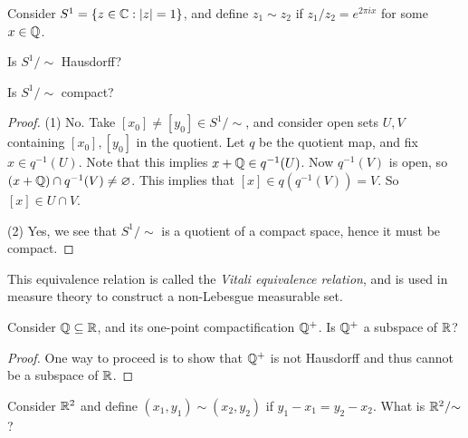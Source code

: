 \begin{exercise}
  Consider $S^1 = \{z \in \mathbb{C} : |z| = 1\}$, and
  define $z_1 \sim z_2$ if
  $z_1 / z_2 = e^{2\pi i x}$ for some
  $x \in \mathbb{Q}$.
  \begin{enumerate*}[(1)]
    \item Is $S^1 / {\sim}$ Hausdorff?
    \item Is $S^1 / {\sim}$ compact?
  \end{enumerate*}
\end{exercise}

\begin{proof}
  (1) No. Take $[x_0] \ne [y_0] \in S^1 / {\sim}$,
  and consider open sets $U, V$ containing
  $[x_0], [y_0]$ in the quotient.
  Let $q$ be the
  quotient map, and fix $x \in q^{-1}(U)$.
  Note that this implies $x + \mathbb{Q} \in q^{-1}(U)$. Now
  $q^{-1}(V)$ is open, so $(x + \mathbb{Q}) \cap q^{-1}(V) \ne \varnothing$.
  This implies that $[x] \in q(q^{-1}(V)) = V$.
  So $[x] \in U \cap V$.

  (2) Yes, we see that $S^1 / {\sim}$ is a quotient of
  a compact space, hence it must be compact.
\end{proof}

\begin{remark}
  This equivalence relation is called the
  \emph{Vitali equivalence relation}, and is
  used in measure theory to construct a
  non-Lebesgue measurable set.
\end{remark}

\begin{exercise}
  Consider $\mathbb{Q} \subseteq \mathbb{R}$, and its
  one-point compactification $\mathbb{Q}^+$. Is $\mathbb{Q}^+$ a
  subspace of $\mathbb{R}$?
\end{exercise}

\begin{proof}
  One way to proceed is to show that $\mathbb{Q}^+$ is not
  Hausdorff and thus cannot be a subspace of $\mathbb{R}$.
\end{proof}

\begin{exercise}
  Consider $\mathbb{R}^2$ and define
  $(x_1, y_1) \sim (x_2, y_2)$ if
  $y_1 - x_1 = y_2 - x_2$. What
  is $\mathbb{R}^2 / {\sim}$?
\end{exercise}

